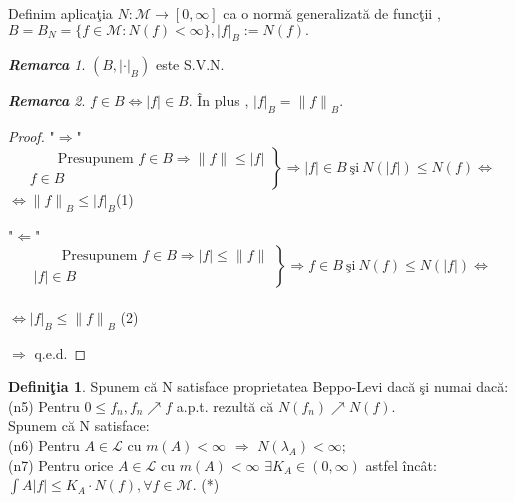 \documentclass[ a4paper, 12pt]{report}
\theoremstyle{definition}
\newtheorem{definition}{\bf Defini\c tia}[section]
\theoremstyle{remark}
\newtheorem{remarc}{\bf Remarca}[section]
\numberwithin{equation}{section}
\begin{document}
Definim aplica\c tia $N : \mathcal{M} \rightarrow [0,\infty]$ ca o norm\u a generalizat\u a de func\c tii ,\\ $B=B_N=\{f \in \mathcal{M} : N(f) < \infty\} , {\lvert f \rvert}_B := N(f).$
\begin{remarc}
$(B,{\lvert \cdot \rvert}_B)$ este S.V.N.
\end{remarc}
\begin{remarc}
$f \in B \Leftrightarrow \lvert f \rvert \in B.$ \^In plus , ${\lvert f \rvert}_B = {\lVert f \rVert}_B.$
\end{remarc}
\begin{proof} 
"$\Rightarrow$"
\begin{equation*}
\left.\begin{aligned}
          \qquad\text{Presupunem $f \in B$} \Rightarrow {\lVert f \rVert} \leq \lvert f \rvert\\
         f \in B 
       \end{aligned}
\right\}
\Rightarrow \lvert f \rvert \in B \ \mbox{\c si}\  N(\lvert f \rvert) \leq N(f) \Leftrightarrow
\end{equation*}
$\Leftrightarrow {\lVert f \rVert}_B \leq {\lvert f \rvert}_B$\hspace{2mm}(1)

"$\Leftarrow$"
\begin{equation*}
\left.\begin{aligned}
          \qquad\text{Presupunem $f \in B$} \Rightarrow {\lvert f \rvert} \leq \lVert f \rVert\\
         \lvert f \rvert \in B 
       \end{aligned}
\right\}
\Rightarrow f \in B \ \mbox{\c si}\  N(f) \leq N(\lvert f \rvert)\Leftrightarrow
\end{equation*}
\\
$\Leftrightarrow {\lvert f \rvert}_B \leq {\lVert f \rVert}_B$ (2)

$\Rightarrow$ q.e.d.
\end{proof}
\begin{definition}
Spunem c\u a N satisface proprietatea Beppo-Levi dac\u a \c si numai dac\u a:\\
(n5) Pentru $0 \leq f_n ,  f_n \nearrow f$ a.p.t. rezult\u a c\u a  $N(f_n) \nearrow N(f).$\\
Spunem c\u a N satisface:\\
(n6) Pentru $A \in \mathcal{L}$ cu $m(A)<\infty$ $\Rightarrow$ $N(\lambda_A)<\infty;$\\
(n7) Pentru orice $A \in \mathcal{L}$ cu $m(A)<\infty$    $\exists  K_A \in (0,\infty)$ astfel \^inc\^at:\\
$\int\limits{A}{} \lvert f \rvert \leq K_A \cdot N(f),\forall f \in \mathcal{M}.$ \hspace{3mm}(*)
\end{definition}
\end{document}
